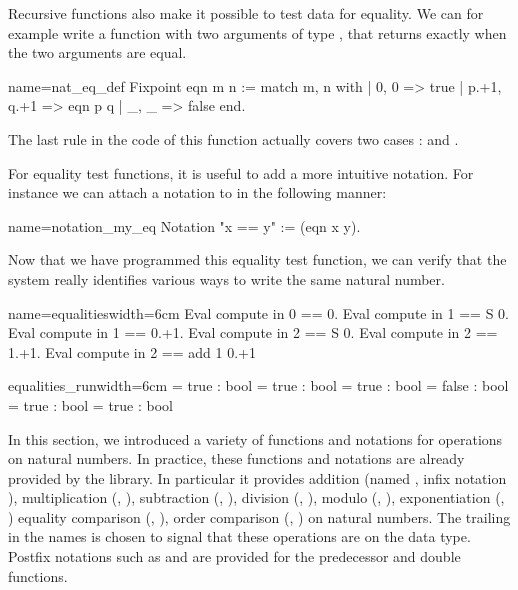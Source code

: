 Recursive functions also make it possible to test data for
equality. We can for example write a function with two arguments of
type , that
returns  exactly when the two arguments are equal.


\begin{coq}{name=nat_eq_def}{}
Fixpoint eqn m n :=
  match m, n with
  | 0, 0 => true
  | p.+1, q.+1 => eqn p q
  | _, _ => false
  end.
\end{coq}
The last rule in the code of this function actually covers two cases :
 and .

For equality test functions, it is useful to add a more intuitive
notation.  For instance we can attach a notation to  in
the following manner:

\begin{coq}{name=notation_my_eq}{}
Notation "x == y" := (eqn x y).
\end{coq}
Now
that we have programmed this equality test function, we can verify
that the \Coq{} system really identifies various ways to write the same
natural number.

\begin{coq}{name=equalities}{width=6cm}
Eval compute in 0 == 0.
Eval compute in 1 == S 0.
Eval compute in 1 == 0.+1.
Eval compute in 2 == S 0.
Eval compute in 2 == 1.+1.
Eval compute in 2 == add 1 0.+1
\end{coq}
\begin{coqout}{equalities_run}{width=6cm}
= true : bool
= true : bool
= true : bool
= false : bool
= true : bool
= true : bool
\end{coqout}



In this section, we introduced a variety of functions and notations
for operations on natural numbers.  In practice, these functions and
notations are already provided by the \mcbMC{} library.  In particular
it provides addition (named , infix notation \C{+}),
multiplication
(, \C{*}), subtraction (, \C{-}), division (,
\C{\%/}),  modulo (, \C{\%\%}), exponentiation (, \C{\^})
equality comparison (, \C{==}), order
comparison (, \C{<=}) on natural numbers.  The trailing  in
the names is chosen to signal that these operations are on the  data
type.  Postfix notations such as  and  are provided for
the predecessor and double functions.

